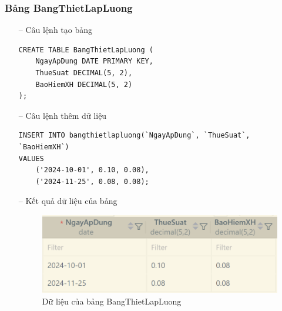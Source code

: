 \subsubsection{Bảng BangThietLapLuong}
\begin{itemize}
    \item [--] Câu lệnh tạo bảng
   \begin{verbatim}
CREATE TABLE BangThietLapLuong (
    NgayApDung DATE PRIMARY KEY,
    ThueSuat DECIMAL(5, 2),
    BaoHiemXH DECIMAL(5, 2)
);
    \end{verbatim}
    \item [--] Câu lệnh thêm dữ liệu
   \begin{verbatim}
INSERT INTO bangthietlapluong(`NgayApDung`, `ThueSuat`, `BaoHiemXH`) 
VALUES  
    ('2024-10-01', 0.10, 0.08),
    ('2024-11-25', 0.08, 0.08);
    \end{verbatim}
    \item [--] Kết quả dữ liệu của bảng
    \begin{figure}[H]
        \centering
        \includegraphics[width=1\linewidth]{content/images/data_bangthietlap.png}
        \caption{Dữ liệu của bảng BangThietLapLuong}
        \label{fig:data_bangthietlap}
    \end{figure}
\end{itemize}
\newpage
